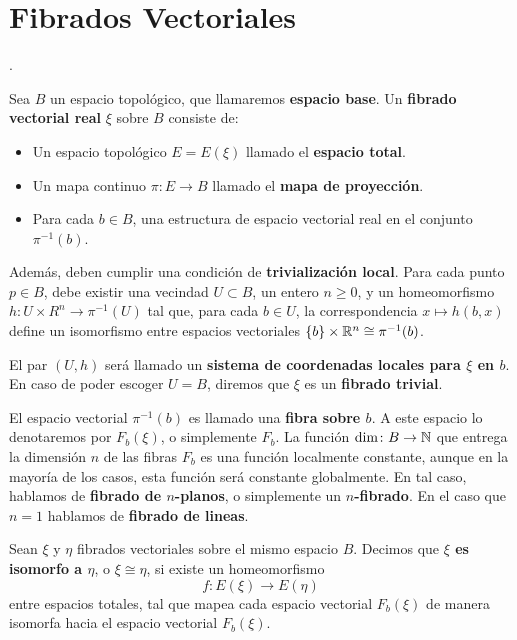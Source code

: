 \newpage
\section{Fibrados Vectoriales}

\cite[\S 2]{ClasesCaracteristicas}.

\begin{definition}
	Sea $B$ un espacio topológico, que llamaremos \textbf{espacio base}. Un \textbf{fibrado vectorial real} $\xi$ sobre $B$ consiste de:
	\begin{itemize}
		\item[1)] Un espacio topológico $E = E(\xi)$ llamado el \textbf{espacio total}.

		\item[2)] Un mapa continuo $\pi \colon E \to B$ llamado el \textbf{mapa de proyección}.

		\item[3)] Para cada $b \in B$, una estructura de espacio vectorial real en el conjunto $\pi^{-1}(b)$.
	\end{itemize}
	Además, deben cumplir una condición de \textbf{trivialización local}. Para cada punto $p \in B$, debe existir una vecindad $U \subset B$, un entero $n \geq 0$, y un homeomorfismo $h \colon U \times R^{n} \to \pi^{-1}(U)$ tal que, para cada $b \in U$, la correspondencia $x \mapsto h(b,x)$ define un isomorfismo entre espacios vectoriales $\{ b \} \times \mathbb{R}^{n} \cong \pi^{-1}(b)$. \par
\end{definition}

El par $(U,h)$ será llamado un \textbf{sistema de coordenadas locales para $\xi$ en $b$}. En caso de poder escoger $U = B$, diremos que $\xi$ es un \textbf{fibrado trivial}. \par
El espacio vectorial $\pi^{-1}(b)$ es llamado una \textbf{fibra sobre $b$}. A este espacio lo denotaremos por $F_{b}(\xi)$, o simplemente $F_{b}$. La función $\dim \colon B \to \mathbb{N}$ que entrega la dimensión $n$ de las fibras $F_{b}$ es una función localmente constante, aunque en la mayoría de los casos, esta función será constante globalmente. En tal caso, hablamos de \textbf{fibrado de $n$-planos}, o simplemente un \textbf{$n$-fibrado}. En el caso que $n = 1$ hablamos de \textbf{fibrado de lineas}.

\begin{definition}
	Sean $\xi$ y $\eta$ fibrados vectoriales sobre el mismo espacio $B$. Decimos que \textbf{$\xi$ es isomorfo a $\eta$}, o $\xi \cong \eta$, si existe un homeomorfismo
	\[ f \colon E(\xi) \to E(\eta) \]
	entre espacios totales, tal que mapea cada espacio vectorial $F_{b}(\xi)$ de manera isomorfa hacia el espacio vectorial $F_{b}(\xi)$.
\end{definition}

